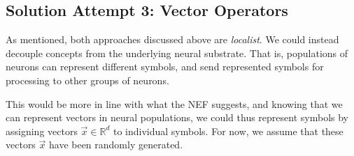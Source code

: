 \documentclass[10pt,letterpaper,oneside]{article}
\begin{document}
\subsection{Solution Attempt 3: Vector Operators}

As mentioned, both approaches discussed above are \emph{localist}. We could instead decouple concepts from the underlying neural substrate. That is, populations of neurons can represent different symbols, and send represented symbols for processing to other groups of neurons.

This would be more in line with what the NEF suggests, and knowing that we can represent vectors in neural populations, we could thus represent symbols by assigning vectors $\vec x \in \mathbb{R}^d$ to individual symbols. For now, we assume that these vectors $\vec x$ have been randomly generated.
\end{document}
